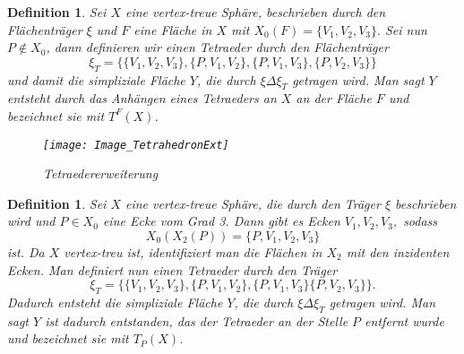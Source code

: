\documentclass[12pt,titlepage,twoside,cleardoublepage]{article}
\theoremstyle{nummermitklammern}
\newtheorem{definition}[temp]{Definition}
\newtheorem{definition}[zahl]{Definition}
\numberwithin{equation}{section}
\begin{document}
\begin{definition}
Sei $X$ eine vertex-treue Sphäre, beschrieben durch den Flächenträger $\xi$ und $F$ eine Fläche in $X$ mit $X_0(F)=\{V_1,V_2,V_3\}.$ Sei nun $P\notin X_0$, dann definieren wir einen Tetraeder durch den Flächenträger
\[
\xi_T=\{\{V_1,V_2,V_3\},\{P,V_1,V_2\},\{P,V_1,V_3\},\{P,V_2,V_3\}\}
\] 
und damit die simpliziale Fläche $Y$, die durch $\xi \Delta \xi_T$ getragen wird. Man sagt $Y$ entsteht durch das Anhängen eines Tetraeders an $X$ an der Fläche $F$ und bezeichnet sie mit $T^F(X)$.
\begin{figure}[H]
\begin{center}
\texttt{[image: Image\_TetrahedronExt]}
\end{center}
\caption{Tetraedererweiterung}
\end{figure}

\end{definition}

\begin{definition}
Sei $X$ eine vertex-treue Sphäre, die durch den Träger $\xi$ beschrieben wird und $P\in X_0$ eine Ecke vom Grad 3. Dann gibt es Ecken $V_1,V_2,V_3,$ sodass
\[
X_0(X_2(P))=\{P,V_1,V_2,V_3\}
\] 
ist. Da $X$ vertex-treu ist, identifiziert man die Flächen in $X_2$  mit den inzidenten Ecken.  Man definiert nun einen Tetraeder durch den Träger 
\[
\xi_T=\{\{V_1,V_2,V_3\},\{P,V_1,V_2\},\{P,V_1,V_3\}\{P,V_2,V_3\}\}.
\]  Dadurch entsteht die simpliziale Fläche $Y$, die durch $\xi \Delta \xi_T$ getragen wird. Man sagt $Y$ ist dadurch entstanden, das der Tetraeder an der Stelle $P$ entfernt wurde und bezeichnet sie mit $T_P(X)$.
\end{definition}
\end{document}
